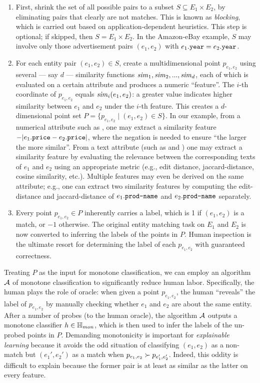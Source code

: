 \begin{enumerate}
    \item First, shrink the set of all possible pairs to a subset $S \subseteq E_1 \times E_2$, by eliminating pairs that clearly are not matches. This is known as {\em blocking}, which is carried out based on application-dependent heuristics. This step is optional; if skipped, then $S = E_1 \times E_2$. In the Amazon-eBay example, $S$ may involve only those advertisement pairs $(e_1, e_2)$ with $e_1.\texttt{year} = e_2.\texttt{year}$.

    \item For each entity pair $(e_1, e_2) \in S$, create a multidimensional point $p_{e_1, e_2}$ using several --- say $d$ --- similarity functions $\mathit{sim}_1, \mathit{sim}_2, ..., \mathit{sim}_d$, each of which is evaluated on a certain attribute and produces a numeric ``feature''. The $i$-th coordinate of $p_{e_1,e_2}$ equals $\mathit{sim}_i(e_1,e_2)$: a greater value indicates higher similarity between $e_1$ and $e_2$ under the $i$-th feature. This creates a $d$-dimensional point set $P = \{p_{e_1,e_2} \mid (e_1, e_2) \in S\}$. In our example, from a numerical attribute such as , one may extract a similarity feature $-|e_1.\texttt{price} - e_2.\texttt{price}|$, where the negation is needed to ensure ``the larger the more similar''. From a text attribute (such as  and ) one may extract a similarity feature by evaluating the relevance between the corresponding texts of $e_1$ and $e_2$ using an appropriate metric (e.g., edit distance, jaccard-distance, cosine similarity, etc.). Multiple features may even be derived on the same attribute; e.g., one can extract two similarity features by computing the edit-distance and jaccard-distance of $e_1.\texttt{prod-name}$ and $e_2.\texttt{prod-name}$ separately.

    \item Every point $p_{e_1,e_2} \in P$ inherently carries a label, which is 1 if $(e_1,e_2)$ is a match, or $-1$ otherwise. The original entity matching task on $E_1$ and $E_2$ is now converted to inferring the labels of the points in $P$. Human inspection is the ultimate resort for determining the label of each $p_{e_1,e_2}$ with guaranteed correctness.
\end{enumerate}


Treating $P$ as the input for monotone classification, we can employ an algorithm $\mathcal{A}$ of monotone classification to significantly reduce human labor. Specifically, the human plays the role of oracle: when given a point $p_{e_1,e_2}$, the human ``reveals'' the label of $p_{e_1,e_2}$ by manually checking whether $e_1$ and $e_2$ are about the same entity. After a  number of probes (to the human oracle), the algorithm $\mathcal{A}$ outputs a monotone classifier $h \in \mathbb{H}_\mathit{mon}$, which is then used to infer the labels of the un-probed points in $P$. Demanding monotonicity is important for {\em explainable learning} because it avoids the odd situation of classifying $(e_1,e_2)$ as a non-match but $(e_1',e_2')$ as a match when $p_{e_1,e_2} \succ p_{e_1',e_2'}$. Indeed, this oddity is difficult to explain because the former pair is at least as similar as the latter on every feature.


